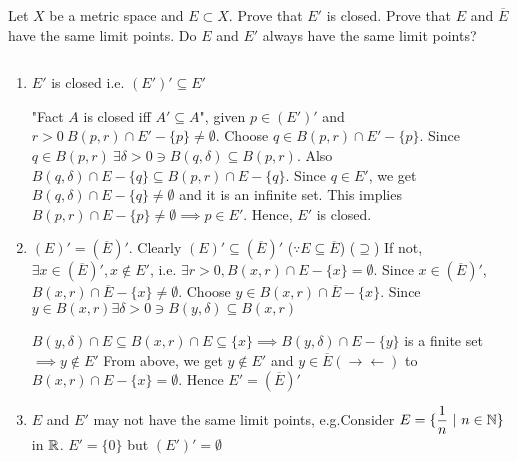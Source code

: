 Let $X$ be a metric space and $E \subset X$. Prove that $E'$ is closed. Prove that $E$ and $\overline{E}$ have the same limit points. Do $E$ and $E'$ always have the same limit points?


\begin{solution}$ $
	\begin{enumerate}[label = $\star)$]
		\item $E'$ is closed i.e. $(E')' \subseteq E'$
		
		"Fact $A$ is closed iff $A' \subseteq A$", given $p \in (E')'$ and $r > 0~ B(p,r) \cap E' - \{p\} \neq \emptyset$. Choose $q \in B(p,r) \cap E' - \{p\}$. Since $q \in B(p,r)~\exists \delta > 0 \ni B(q,\delta) \subseteq B(p,r)$. Also $B(q,\delta) \cap E - \{q\} \subseteq B(p,r) \cap E - \{q\}$. Since $q \in E'$, we get $B(q,\delta) \cap E - \{q\} \neq \emptyset$ and it is an infinite set. This implies $B(p,r) \cap E - \{p\} \neq \emptyset \implies p \in E'$. Hence, $E'$ is closed.
		
		\item $(E)' = (\overline{E})'$. Clearly $(E)' \subseteq (\overline{E})'$ ($\because E \subseteq \overline{E}$)
		($\supseteq$) If not, $\exists x \in (\overline{E})',x\notin E'$, i.e. $\exists r>0, B(x,r) \cap E - \{x\} = \emptyset$. Since $x \in (\overline{E})'$, $B(x,r) \cap \overline{E} - \{x\} \neq \emptyset$. Choose $y \in B(x,r) \cap \overline{E} - \{x\}$. Since $y \in B(x,r) \exists \delta > 0 \ni B(y,\delta) \subseteq B(x,r)$
		
		$B(y,\delta) \cap E \subseteq B(x,r) \cap E \subseteq \{x\} \implies B(y,\delta) \cap E - \{y\}$ is a finite set $\implies y \notin E'$ From above, we get $y \notin E'$ and $y \in \overline{E} (\rightarrow\leftarrow)$ to $B(x,r) \cap E - \{x\} = \emptyset$. Hence $E' = (\overline{E})'$
		
		\item $E$ and $E'$ may not have the same limit points, e.g.Consider $E = \{\dfrac{1}{n}~|~ n \in \mathbb{N}\}$ in $\mathbb{R}$. $E' = \{0\}$ but $(E')' = \emptyset$
	\end{enumerate}
\end{solution}














